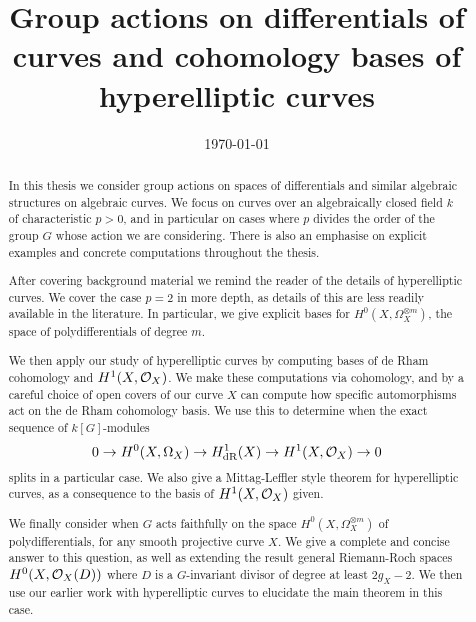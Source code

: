 \documentclass{ecsthesis}      %
\begin{document}
\frontmatter
\title      {Group actions on differentials of curves and cohomology bases of hyperelliptic curves}
\addresses  {\groupname\\\deptname\\\univname}
\date       {\today}
\subject    {}
\keywords   {}
\maketitle
\pagebreak
\pagebreak
\begin{abstract}
In this thesis we consider group actions on spaces of differentials and similar algebraic structures on algebraic curves.
We focus on curves over an algebraically closed field $k$ of characteristic $p >0$, and in particular on cases where $p$ divides the order of the group $G$ whose action we are considering.
There is also an emphasise on explicit examples and concrete computations throughout the thesis.

After covering background material we remind the reader of the details of hyperelliptic curves.
We cover the case $p = 2$ in more depth, as details of this are less readily available in the literature.
In particular, we give explicit bases for $H^0(X,\Omega_X^{\otimes m})$, the space of polydifferentials of degree $m$.

We then apply our study of hyperelliptic curves by computing bases of de Rham cohomology and $H^1(X,\mathcal{O}_X)$.
We make these computations via \cech cohomology, and by a careful choice of open covers of our curve $X$ can compute how specific automorphisms act on the de Rham cohomology basis.
We use this to determine when the exact sequence of $k[G]$-modules
    \[
    0 \rightarrow {H^0(X,\Omega_X)} \rightarrow H^1_{\text{dR}}(X) \rightarrow H^1(X,\mathcal{O}_X) \rightarrow 0
    \]
splits in a particular case.
We also give a Mittag-Leffler style theorem for hyperelliptic curves, as a consequence to the basis of $H^1(X,\mathcal{O}_X)$ given.

We finally consider when $G$ acts faithfully on the space $H^0(X,\Omega_X^{\otimes m})$ of polydifferentials, for any smooth projective curve $X$.
We give a complete and concise answer to this question, as well as extending the result general Riemann-Roch spaces $H^0(X,{\cal O}_X(D))$ where $D$ is a $G$-invariant divisor of degree at least $2g_X - 2$.
We then use our earlier work with hyperelliptic curves to elucidate the main theorem in this case.
\end{abstract}
\end{document}
